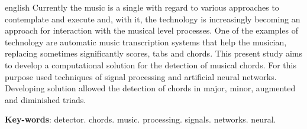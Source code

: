 \begin{resumo}[Abstract]
 \begin{otherlanguage*}{english}
   Currently the music is a single with regard to various approaches to contemplate and execute and, with it, the technology is increasingly becoming an approach for interaction with the musical level processes. One of the examples of technology are automatic music transcription systems that help the musician, replacing sometimes significantly scores, tabs and chords. This present study aims to develop a computational solution for the detection of musical chords. For this purpose used techniques of signal processing and artificial neural networks. Developing solution allowed the detection of chords in major, minor, augmented and diminished triads.

   \vspace{\onelineskip}
 
   \noindent 
   \textbf{Key-words}: detector. chords. music. processing. signals. networks. neural.
 \end{otherlanguage*}
\end{resumo}
